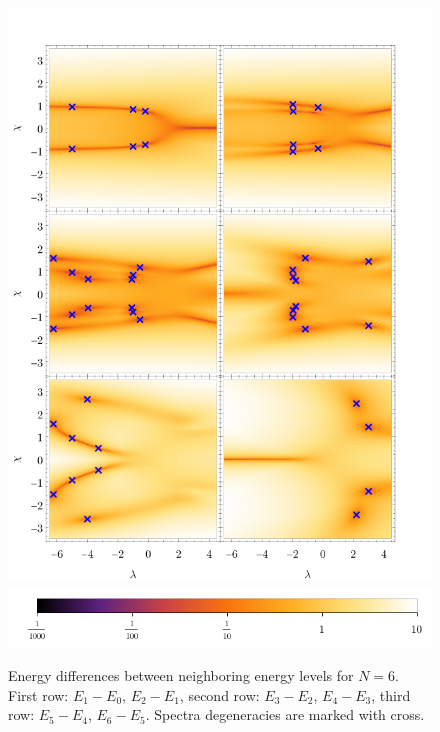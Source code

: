 \begin{figure}[H]
    \centering
    \includegraphics[scale=1.3]{../img/singularitiesBetweenEnergiesN=6.pdf}
    \includegraphics[scale=1.3]{../img/N=5_bar6.pdf}
    \caption{Energy differences between neighboring energy levels for $N=6$. First row: $E_1-E_0$, $E_2-E_1$, second row: $E_3-E_2$, $E_4-E_3$, third row: $E_5-E_4$, $E_6-E_5$. Spectra degeneracies are marked with  cross.}
    \label{fig:singularitiesBetweenEnergiesN=6}    
\end{figure}


